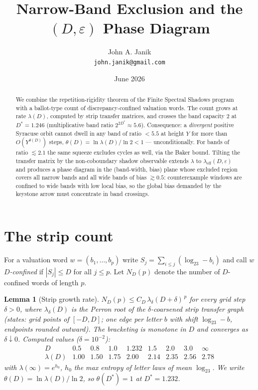 \documentclass[11pt]{article}
\title{Narrow-Band Exclusion and the $(D,\varepsilon)$ Phase Diagram}
\author{John A. Janik\\ \small\texttt{john.janik@gmail.com}}
\date{June 2026}
\newtheorem{lemma}{Lemma}
\begin{document}
\maketitle

\begin{abstract}
We combine the repetition-rigidity theorem of the Finite Spectral Shadows
program with a ballot-type count of discrepancy-confined valuation words.
The count grows at rate $\lambda(D)$, computed by strip transfer
matrices, and crosses the band capacity $2$ at $D^*=1.246$ (multiplicative
band ratio $2^{2D^*}\approx5.6$). Consequence: a \emph{divergent} positive
Syracuse orbit cannot dwell in any band of ratio $<5.5$ at height $Y$ for
more than $O(Y^{\theta(D)})$ steps, $\theta(D)=\ln\lambda(D)/\ln2<1$ ---
unconditionally. For bands of ratio $\lesssim2.1$ the same squeeze
excludes cycles as well, via the Baker bound. Tilting the transfer matrix
by the non-coboundary shadow observable extends $\lambda$ to
$\lambda_{\mathrm{eff}}(D,\varepsilon)$ and produces a phase diagram in
the (band-width, bias) plane whose excluded region covers all narrow
bands and all wide bands of bias $\gtrsim0.5$: counterexample windows are
confined to wide bands with low local bias, so the global bias demanded
by the keystone arrow must concentrate in band crossings.
\end{abstract}

\section{The strip count}

For a valuation word $w=(b_1,\dots,b_p)$ write
$S_j=\sum_{i\le j}(\log_23-b_i)$ and call $w$ \emph{$D$-confined} if
$|S_j|\le D$ for all $j\le p$. Let $N_D(p)$ denote the number of
$D$-confined words of length $p$.

\begin{lemma}[Strip growth rate]\label{lem:strip}
$N_D(p)\le C_D\,\lambda_\delta(D+\delta)^{\,p}$ for every grid step
$\delta>0$, where $\lambda_\delta(D)$ is the Perron root of the
$\delta$-coarsened strip transfer graph (states: grid points of
$[-D,D]$; one edge per letter $b$ with shift $\log_23-b$, endpoints
rounded outward). The bracketing is monotone in $D$ and converges as
$\delta\downarrow0$. Computed values ($\delta=10^{-2}$):
\[
\begin{array}{c|cccccccc}
D & 0.5 & 0.8 & 1.0 & 1.232 & 1.5 & 2.0 & 3.0 & \infty\\\hline
\lambda(D) & 1.00 & 1.50 & 1.75 & \mathbf{2.00} & 2.14 & 2.35 & 2.56 & 2.78
\end{array}
\]
with $\lambda(\infty)=e^{h_0}$, $h_0$ the max entropy of letter laws of
mean $\log_23$. We write $\theta(D)=\ln\lambda(D)/\ln2$, so
$\theta(D^*)=1$ at $D^*=1.232$.
\end{lemma}
\end{document}
